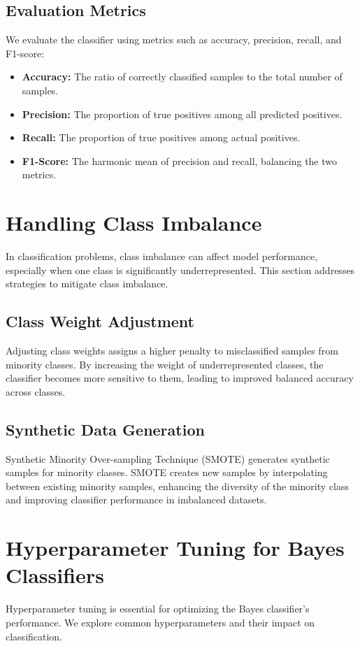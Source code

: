 \documentclass[conference]{IEEEtran}
\begin{document}
	\subsection{Evaluation Metrics}
	We evaluate the classifier using metrics such as accuracy, precision, recall, and F1-score:
	\begin{itemize}
		\item \textbf{Accuracy:} The ratio of correctly classified samples to the total number of samples.
		\item \textbf{Precision:} The proportion of true positives among all predicted positives.
		\item \textbf{Recall:} The proportion of true positives among actual positives.
		\item \textbf{F1-Score:} The harmonic mean of precision and recall, balancing the two metrics.
	\end{itemize}
	
	\section{Handling Class Imbalance}
	In classification problems, class imbalance can affect model performance, especially when one class is significantly underrepresented. This section addresses strategies to mitigate class imbalance.
	
	\subsection{Class Weight Adjustment}
	Adjusting class weights assigns a higher penalty to misclassified samples from minority classes. By increasing the weight of underrepresented classes, the classifier becomes more sensitive to them, leading to improved balanced accuracy across classes.
	
	\subsection{Synthetic Data Generation}
	Synthetic Minority Over-sampling Technique (SMOTE) generates synthetic samples for minority classes. SMOTE creates new samples by interpolating between existing minority samples, enhancing the diversity of the minority class and improving classifier performance in imbalanced datasets.
	
	\section{Hyperparameter Tuning for Bayes Classifiers}
	Hyperparameter tuning is essential for optimizing the Bayes classifier’s performance. We explore common hyperparameters and their impact on classification.
	
\end{document}
